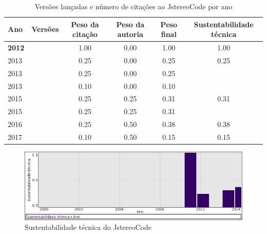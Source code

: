 \begin{table}[H]
\caption{Versões lançadas e número de citações ao JstereoCode por ano}
\centering
\begin{tabular}{| l | c | c | c | c | c |}
  \hline
  Ano & Versões & Peso da citação & Peso da autoria & Peso final & Sustentabilidade técnica \\
  \hline
            {\bf 2012}
          &
          
          &
          1.00
          &
          0.00
          &
          1.00
          &
            {\color{blue} 1.00}
          \\
\hline
            2013
          &
          
          &
          0.25
          &
          0.00
          &
          0.25
          &
            {\color{red} 0.25}
          \\
            2013
          &
          
          &
          0.25
          &
          0.00
          &
          0.25
          &
          \\
            2013
          &
          
          &
          0.10
          &
          0.00
          &
          0.10
          &
          \\
\hline
            2015
          &
          
          &
          0.25
          &
          0.25
          &
          0.31
          &
            {\color{red} 0.31}
          \\
            2015
          &
          
          &
          0.25
          &
          0.25
          &
          0.31
          &
          \\
\hline
            2016
          &
          
          &
          0.25
          &
          0.50
          &
          0.38
          &
            {\color{red} 0.38}
          \\
\hline
            2017
          &
          
          &
          0.10
          &
          0.50
          &
          0.15
          &
            {\color{red} 0.15}
          \\
\hline
\end{tabular}
\end{table}

\begin{figure}[h]
  \center
  \includegraphics[scale=0.50]{result-documents/charts/jstereocode.png}
  \caption{Sustentabilidade técnica do JstereoCode}
\end{figure}


